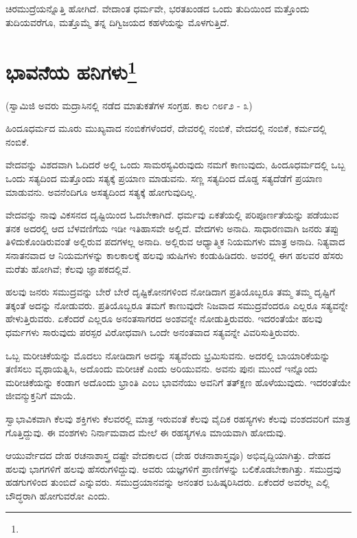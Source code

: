 ಚಿರಮುದ್ರೆಯನ್ನೊತ್ತಿ ಹೋಗಿದೆ. ವೇದಾಂತ ಧರ್ಮವೇ, ಭರತಖಂಡದ ಒಂದು ತುದಿಯಿಂದ ಮತ್ತೊಂದು ತುದಿಯವರೆಗೂ, ಮತ್ತೊಮ್ಮೆ ತನ್ನ ದಿಗ್ವಿಜಯದ ಕಹಳೆಯನ್ನು ಮೊಳಗುತ್ತಿದೆ.

\newpage

\chapter[ಭಾವನೆಯ ಹನಿಗಳು]{ಭಾವನೆಯ ಹನಿಗಳು\protect\footnote{}}

\begin{center}
(ಸ್ವಾಮಿಜಿ ಅವರು ಮದ್ರಾಸಿನಲ್ಲಿ ನಡೆದ ಮಾತುಕತೆಗಳ ಸಂಗ್ರಹ. ಕಾಲ ೧೮೯೨ - ೩)
\end{center}

ಹಿಂದೂಧರ್ಮದ ಮೂರು ಮುಖ್ಯವಾದ ನಂಬಿಕೆಗಳೆಂದರೆ, ದೇವರಲ್ಲಿ ನಂಬಿಕೆ, ವೇದದಲ್ಲಿ ನಂಬಿಕೆ, ಕರ್ಮದಲ್ಲಿ ನಂಬಿಕೆ.

ವೇದವನ್ನು ವಿಶದವಾಗಿ ಓದಿದರೆ ಅಲ್ಲಿ ಒಂದು ಸಾಮರಸ್ಯವಿರುವುದು ನಮಗೆ ಕಾಣುವುದು, ಹಿಂದೂಧರ್ಮದಲ್ಲಿ ಒಬ್ಬ ಒಂದು ಸತ್ಯದಿಂದ ಮತ್ತೊಂದು ಸತ್ಯಕ್ಕೆ ಪ್ರಯಾಣ ಮಾಡುವನು. ಸಣ್ಣ ಸತ್ಯದಿಂದ ದೊಡ್ಡ ಸತ್ಯದೆಡೆಗೆ ಪ್ರಯಾಣ ಮಾಡುವನು. ಅವನೆಂದಿಗೂ ಅಸತ್ಯದಿಂದ ಸತ್ಯಕ್ಕೆ ಹೋಗುವುದಿಲ್ಲ.

ವೇದವನ್ನು ನಾವು ವಿಕಸನದ ದೃಷ್ಟಿಯಿಂದ ಓದಬೇಕಾಗಿದೆ. ಧರ್ಮವು ಏಕತೆಯಲ್ಲಿ ಪರಿಪೂರ್ಣತೆಯನ್ನು ಪಡೆಯುವ ತನಕ ಅದರಲ್ಲಿ ಆದ ಬೆಳವಣಿಗೆಯ ಇಡೀ ಇತಿಹಾಸವೇ ಅಲ್ಲಿದೆ. ವೇದಗಳು ಅನಾದಿ. ಸಾಧಾರಣವಾಗಿ ಜನರು ತಪ್ಪು ತಿಳಿದುಕೊಂಡಿರುವಂತೆ ಅಲ್ಲಿರುವ ಪದಗಳಲ್ಲ ಅನಾದಿ. ಅಲ್ಲಿರುವ ಆಧ್ಯಾತ್ಮಿಕ ನಿಯಮಗಳು ಮಾತ್ರ ಅನಾದಿ. ನಿತ್ಯವಾದ ಸನಾತನವಾದ ಆ ನಿಯಮಗಳನ್ನು ಕಾಲಕಾಲಕ್ಕೆ ಹಲವು ಋಷಿಗಳು ಕಂಡುಹಿಡಿದರು. ಅವರಲ್ಲಿ ಈಗ ಹಲವರ ಹೆಸರು ಮರೆತು ಹೋಗಿವೆ; ಕೆಲವು ಜ್ಞಾಪಕದಲ್ಲಿವೆ.

ಹಲವು ಜನರು ಸಮುದ್ರವನ್ನು ಬೇರೆ ಬೇರೆ ದೃಷ್ಟಿಕೋನಗಳಿಂದ ನೋಡಿದಾಗ ಪ್ರತಿಯೊಬ್ಬರೂ ತಮ್ಮ ತಮ್ಮ ದೃಷ್ಟಿಗೆ ತಕ್ಕಂತೆ ಅದನ್ನು ನೋಡುವರು. ಪ್ರತಿಯೊಬ್ಬರೂ ತಮಗೆ ಕಾಣುವುದೇ ನಿಜವಾದ ಸಮುದ್ರವೆಂದರೂ ಎಲ್ಲರೂ ಸತ್ಯವನ್ನೇ ಹೇಳುತ್ತಿರುವರು. ಏಕೆಂದರೆ ಎಲ್ಲರೂ ಅನಂತಸಾಗರದ ಅಂಶವನ್ನೇ ನೋಡುತ್ತಿರುವರು. ಇದರಂತೆಯೇ ಹಲವು ಧರ್ಮಗಳು ಸಾರುವುದು ಪರಸ್ಪರ ವಿರೋಧವಾಗಿ ಒಂದೇ ಅನಂತವಾದ ಸತ್ಯವನ್ನೇ ವಿವರಿಸುತ್ತಿರುವರು.

ಒಬ್ಬ ಮರೀಚಿಕೆಯನ್ನು ಮೊದಲು ನೋಡಿದಾಗ ಅದನ್ನು ಸತ್ಯವೆಂದು ಭ್ರಮಿಸುವನು. ಅದರಲ್ಲಿ ಬಾಯಾರಿಕೆಯನ್ನು ತಣಿಸಲು ವೃಥಾಯತ್ನಿಸಿ, ಅದೊಂದು ಮರೀಚಿಕೆ ಎಂದು ಅರಿಯುವನು. ಅವನು ಪುನಃ ಮುಂದೆ ಇನ್ನೊಂದು ಮರೀಚಿಕೆಯನ್ನು ಕಂಡಾಗ ಅದೊಂದು ಭ್ರಾಂತಿ ಎಂಬ ಭಾವನೆಯು ಅವನಿಗೆ ತತ್‌ಕ್ಷಣ ಹೊಳೆಯುವುದು. ಇದರಂತೆಯೇ ಜೀವನ್ಮುಕ್ತನಿಗೆ ಮಾಯೆ.

ಸ್ವಾಭಾವಿಕವಾಗಿ ಕೆಲವು ಶಕ್ತಿಗಳು ಕೆಲವರಲ್ಲಿ ಮಾತ್ರ ಇರುವಂತೆ ಕೆಲವು ವೈದಿಕ ರಹಸ್ಯಗಳು ಕೆಲವು ವಂಶದವರಿಗೆ ಮಾತ್ರ ಗೊತ್ತಿದ್ದುವು. ಈ ವಂಶಗಳು ನಿರ್ನಾಮವಾದ ಮೇಲೆ ಈ ರಹಸ್ಯಗಳೂ ಮಾಯವಾಗಿ ಹೋದುವು.

ಆಯುರ್ವೇದದ ದೇಹ ರಚನಾಶಾಸ್ತ್ರ  ದಷ್ಟೇ ವೇದಕಾಲದ (ದೇಹ ರಚನಾಶಾಸ್ತ್ರವೂ) ಅಭಿವೃದ್ದಿಯಾಗಿತ್ತು. ದೇಹದ ಹಲವು ಭಾಗಗಳಿಗೆ ಹಲವು ಹೆಸರುಗಳಿದ್ದುವು. ಅವರು ಯಜ್ಞಗಳಿಗೆ ಪ್ರಾಣಿಗಳನ್ನು ಬಲಿಕೊಡಬೇಕಾಗಿತ್ತು. ಸಮುದ್ರವು ಹಡಗುಗಳಿಂದ ತುಂಬಿದೆ ಎನ್ನುವರು. ಸಮುದ್ರಯಾನವನ್ನು ಅನಂತರ ಬಹಿಷ್ಕರಿಸಿದರು. ಏಕೆಂದರೆ ಅವರೆಲ್ಲ ಎಲ್ಲಿ ಬೌದ್ಧರಾಗಿ ಹೋಗುವರೋ ಎಂದು.

